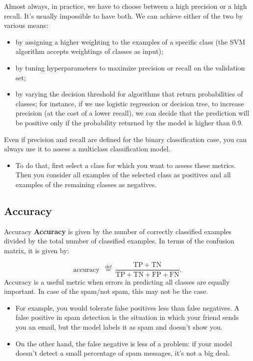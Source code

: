 \documentclass[8pt,dvipsnames]{beamer}
\begin{document}
\begin{frame}
	Almost always, in practice, we have to choose between a high precision or a high recall. It's usually impossible to have both. We can achieve either of the two by various means:
	\begin{itemize}
		\item by assigning a higher weighting to the examples of a specific class (the SVM algorithm accepts weightings of classes as input);
		\item by tuning hyperparameters to maximize precision or recall on the validation set;
		\item by varying the decision threshold for algorithms that return probabilities of classes; for instance, if we use logistic regression or decision tree, to increase precision (at the cost of a lower recall), we can decide that the prediction will be positive only if the probability returned by the model is higher than 0.9.
	\end{itemize}
	Even if precision and recall are defined for the binary classification case, you can always use it to assess a multiclass classification model.
	\begin{itemize}
		\item 	To do that, first select a class for which you want to assess these metrics. Then you consider all examples of the selected class as positives and all examples of the remaining classes as negatives.
	\end{itemize}
\end{frame}

\subsection{Accuracy}
\begin{frame}{Accuracy}
	\textbf{Accuracy} is given by the number of correctly classified examples divided by the total number of classified examples. In terms of the confusion matrix, it is given by:

	$$
		\text { accuracy } \stackrel{\text { def }}{=} \frac{\mathrm{TP}+\mathrm{TN}}{\mathrm{TP}+\mathrm{TN}+\mathrm{FP}+\mathrm{FN}} \text {. }
	$$
	Accuracy is a useful metric when errors in predicting all classes are equally important. In case of the spam/not spam, this may not be the case.
	\begin{itemize}
		\item 	For example, you would tolerate false positives less than false negatives. A false positive in spam detection is the situation in which your friend sends you an email, but the model labels it as spam and doesn't show you.
		\item On the other hand, the false negative is less of a problem: if your model doesn't detect a small percentage of spam messages, it's not a big deal.
	\end{itemize}
\end{frame}
\end{document}
